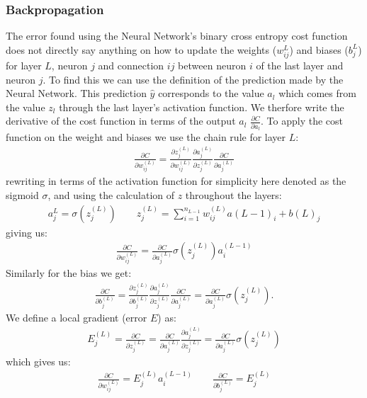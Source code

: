 \documentclass[11pt]{article}
\begin{document}
\subsubsection*{Backpropagation}
The error found using the Neural Network's binary cross entropy cost function does not directly say anything on how to update the weights ($w_{ij}^{L}$) and biases ($b_{j}^{L}$) for layer $L$, neuron $j$ and connection $ij$ between neuron $i$ of the last layer and neuron $j$. To find this we can use the definition of the prediction made by the Neural Network. This prediction $\hat{y}$ corresponds to the value $a_l$ which comes from the value $z_l$ through the last layer's activation function. We therfore write the derivative of the cost function in terms of the output $a_l$ $\frac{\partial C }{\partial a_l}$. To apply the cost function on the weight and biases we use the chain rule for layer $L$:
\begin{align*}
    \frac{\partial C}{\partial w^{(L)}_{ij}}  = \frac{\partial z^{(L)}_j}{\partial w^{(L)}_{ij}}  \frac{\partial a^{(L)}_{j}}{\partial z^{(L)}_j}  \frac{\partial C}{\partial a^{(L)}_j}
\end{align*}
rewriting in terms of the activation function for simplicity here denoted as the sigmoid $\sigma$, and using the calculation of $z$ throughout the layers:
\begin{align*}
    a_j^L = \sigma(z_j^{(L)}) \quad\quad z_j^{(L)} = \sum_{i=1}^{n_{L-1}}w^{(L)}_{ij}a{(L-1)}_{i} + b{(L)}_{j}
\end{align*}
giving us:
\begin{align*}
    \frac{\partial C}{\partial w^{(L)}_{ij}} = \frac{\partial C}{\partial a^{(L)}_{j}}\sigma(z_j^{(L)})a_i^{(L-1)}
\end{align*}
Similarly for the bias we get:
\begin{align*}
    \frac{\partial C}{\partial b^{(L)}_{j}} = \frac{\partial z^{(L)}_j}{\partial b^{(L)}_{j}}  \frac{\partial a^{(L)}_{j}}{\partial z^{(L)}_j}  \frac{\partial C}{\partial a^{(L)}_j} =
    \frac{\partial C}{\partial a^{(L)}_{j}}\sigma(z_j^{(L)}).
\end{align*}
We define a local gradient (error $E$) as:
\begin{align*}
    E_j^{(L)} = \frac{\partial C }{\partial z_j^{(L)}} = \frac{\partial C }{\partial a_j^{(L)}}\frac{\partial a_j^{(L)} }{\partial z_j^{(L)}} = \frac{\partial C }{\partial a_j^{(L)}} \sigma(z_j^{(L)})
\end{align*}
which gives us:
\begin{align*}
    \frac{\partial C }{\partial w_{ij}^{(L)}} = E_j^{(L)} a_i^{(L-1)} \quad\quad
    \frac{\partial C }{\partial b_{j}^{(L)}} = E_j^{(L)}
\end{align*}
\end{document}
